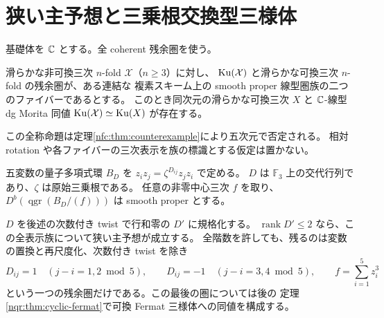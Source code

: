 \section{狭い主予想と三乗根交換型三様体}
\label{nqt:sec:narrow}
基礎体を $\mathbb C$ とする。全 coherent 残余圏を使う。
\begin{remark}[否定された狭い全称命題]\label{nqt:conj:narrow}
滑らかな非可換三次 $n$-fold $\mathcal X$（$n\ge3$）に対し、
$\operatorname{Ku}(\mathcal X)$ と滑らかな可換三次 $n$-fold の残余圏が、ある連結な
複素スキーム上の smooth proper 線型圏族の二つのファイバーであるとする。
このとき同次元の滑らかな可換三次 $X$ と
$\mathbb C$-線型 dg Morita 同値 $\operatorname{Ku}(\mathcal X)\simeq\operatorname{Ku}(X)$ が存在する。
\end{remark}
この全称命題は定理\ref{nfc:thm:counterexample}により五次元で否定される。
相対 rotation や各ファイバーの三次表示を族の標識とする仮定は置かない。

五変数の量子多項式環 $B_D$ を
$z_i z_j=\zeta^{D_{ij}}z_j z_i$ で定める。
$D$ は $\mathbb F_3$ 上の交代行列であり、$\zeta$ は原始三乗根である。
任意の非零中心三次 $f$ を取り、
$D^b(\operatorname{qgr}(B_D/(f)))$ は smooth proper とする。

\begin{theorem}\label{nqt:thm:reduction}
$D$ を後述の次数付き twist で行和零の $D'$ に規格化する。
$\operatorname{rank} D'\le2$ なら、この全表示族について狭い主予想が成立する。
全階数を許しても、残るのは変数の置換と再尺度化、次数付き twist を除き
\[
 D_{ij}=1\quad(j-i=1,2\bmod 5),\qquad
 D_{ij}=-1\quad(j-i=3,4\bmod 5),\qquad f=\sum_{i=1}^5 z_i^3
\]
という一つの残余圏だけである。この最後の圏については後の
定理\ref{nqr:thm:cyclic-fermat}で可換 Fermat 三様体への同値を構成する。
\end{theorem}

